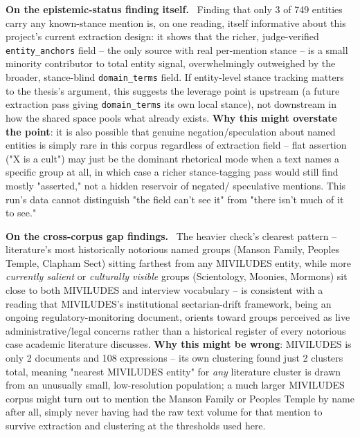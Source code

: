 \documentclass[11pt,a4paper]{article}
\newenvironment{interpbox}[1][Possible interpretation]
  {\par\vspace{6pt}\noindent{\color{interpline}\rule{\linewidth}{0.8pt}}\par\vspace{3pt}
   \noindent\small\textcolor{interpline}{\textbf{#1.}}\ \ignorespaces}
  {\par\vspace{3pt}\noindent{\color{interpline}\rule{\linewidth}{0.8pt}}\vspace{6pt}\par}
\begin{document}
\begin{interpbox}[On the epistemic-status finding itself]
Finding that only 3 of 749 entities carry any known-stance mention is,
on one reading, itself informative about this project's current
extraction design: it shows that the richer, judge-verified
\texttt{entity\_anchors} field -- the only source with real per-mention
stance -- is a small minority contributor to total entity signal,
overwhelmingly outweighed by the broader, stance-blind
\texttt{domain\_terms} field. If entity-level stance tracking matters to
the thesis's argument, this suggests the leverage point is upstream (a
future extraction pass giving \texttt{domain\_terms} its own local
stance), not downstream in how the shared space pools what already
exists. \textbf{Why this might overstate the point}: it is also possible
that genuine negation/speculation about named entities is simply rare in
this corpus regardless of extraction field -- flat assertion ("X is a
cult") may just be the dominant rhetorical mode when a text names a
specific group at all, in which case a richer stance-tagging pass would
still find mostly "asserted," not a hidden reservoir of negated/
speculative mentions. This run's data cannot distinguish "the field
can't see it" from "there isn't much of it to see."
\end{interpbox}

\begin{interpbox}[On the cross-corpus gap findings]
The heavier check's clearest pattern -- literature's most historically
notorious named groups (Manson Family, Peoples Temple, Clapham Sect)
sitting farthest from any MIVILUDES entity, while more \emph{currently
salient} or \emph{culturally visible} groups (Scientology, Moonies,
Mormons) sit close to both MIVILUDES and interview vocabulary -- is
consistent with a reading that MIVILUDES's institutional
sectarian-drift framework, being an ongoing regulatory-monitoring
document, orients toward groups perceived as live administrative/legal
concerns rather than a historical register of every notorious case
academic literature discusses. \textbf{Why this might be wrong}:
MIVILUDES is only 2 documents and 108 expressions -- its own clustering
found just 2 clusters total, meaning "nearest MIVILUDES entity" for
\emph{any} literature cluster is drawn from an unusually small,
low-resolution population; a much larger MIVILUDES corpus might turn out
to mention the Manson Family or Peoples Temple by name after all, simply
never having had the raw text volume for that mention to survive
extraction and clustering at the thresholds used here.
\end{interpbox}
\end{document}
